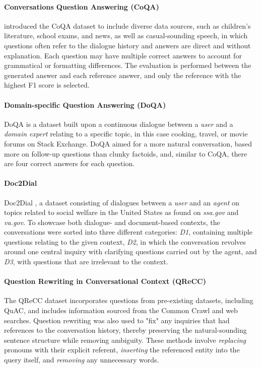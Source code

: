 \documentclass[11pt]{article}
\begin{document}
\paragraph{Conversations Question Answering (CoQA)}
\citet{reddy_coqa_2019} introduced the CoQA dataset to include diverse data sources, such as children's literature, school exams, and news, as well as casual-sounding speech, in which questions often refer to the dialogue history and answers are direct and without explanation. Each question may have multiple correct answers to account for grammatical or formatting differences. The evaluation is performed between the generated answer and each reference answer, and only the reference with the highest F1 score is selected.

\paragraph{Domain-specific Question Answering (DoQA)}
DoQA \cite{campos_doqa_2020} is a dataset built upon a continuous dialogue between a \textit{user} and a \textit{domain expert} relating to a specific topic, in this case cooking, travel, or movie forums on Stack Exchange. DoQA aimed for a more natural conversation, based more on follow-up questions than clunky factoids, and, similar to CoQA, there are four correct answers for each question. 

\paragraph{Doc2Dial}
Doc2Dial \cite{feng_doc2dial_2020}, a dataset consisting of dialogues between a \textit{user} and an \textit{agent} on topics related to social welfare in the United States as found on \textit{ssa.gov} and \textit{va.gov}. To showcase both dialogue- and document-based contexts, the conversations were sorted into three different categories: \textit{D1}, containing multiple questions relating to the given context, \textit{D2}, in which the conversation revolves around one central inquiry with clarifying questions carried out by the agent, and \textit{D3}, with questions that are irrelevant to the context. 

\paragraph{Question Rewriting in Conversational Context (QReCC)}
The QReCC \cite{ye_enhancing_2023} dataset incorporates questions from pre-existing datasets, including QuAC, and includes information sourced from the Common Crawl and web searches. Question rewriting was also used to "fix" any inquiries that had references to the conversation history, thereby preserving the natural-sounding sentence structure while removing ambiguity. These methods involve \textit{replacing} pronouns with their explicit referent, \textit{inserting} the referenced entity into the query itself, and \textit{removing} any unnecessary words.
\end{document}
